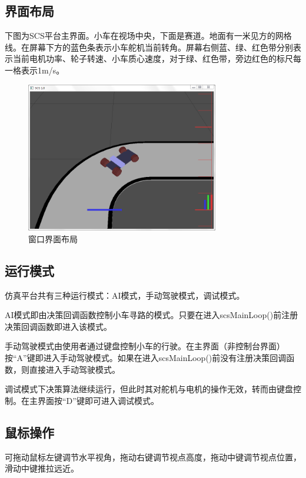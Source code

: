 \documentclass[titlepage,a4paper]{ctexart}
\begin{document}
\subsection{界面布局}
下图为SCS平台主界面。小车在视场中央，下面是赛道。地面有一米见方的网格线。在屏幕下方的蓝色条表示小车舵机当前转角。屏幕右侧蓝、绿、红色带分别表示当前电机功率、轮子转速、小车质心速度，对于绿、红色带，旁边红色的标尺每一格表示1m/s。
\begin{figure}[!htbp]
\centering
\includegraphics[width=0.75\textwidth]{window.png}
\caption{窗口界面布局}
\end{figure}
\subsection{运行模式}
仿真平台共有三种运行模式：AI模式，手动驾驶模式，调试模式。

AI模式即由决策回调函数控制小车寻路的模式。只要在进入scsMainLoop()前注册决策回调函数即进入该模式。

手动驾驶模式由使用者通过键盘控制小车的行驶。在主界面（非控制台界面）按“A”键即进入手动驾驶模式。如果在进入scsMainLoop()前没有注册决策回调函数，则直接进入手动驾驶模式。

调试模式下决策算法继续运行，但此时其对舵机与电机的操作无效，转而由键盘控制。在主界面按“D”键即可进入调试模式。

\subsection{鼠标操作}
可拖动鼠标左键调节水平视角，拖动右键调节视点高度，拖动中键调节视点位置，滑动中键推拉远近。
\end{document}

